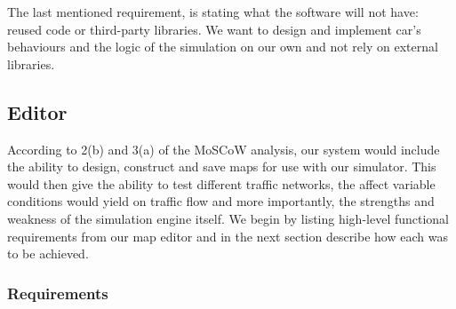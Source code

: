 The last mentioned requirement, is stating what the software will not have: reused code or third-party libraries. We want to design and implement car's behaviours and the logic of the simulation on our own and not rely on external libraries.

\pagebreak

\subsection{Editor}\label{ss:req-editor}
According to 2(b) and 3(a) of the MoSCoW analysis, our system would include the ability to design, construct and save maps for use with our simulator. This would then give the ability to test different traffic networks, the affect variable conditions would yield on traffic flow and more importantly, the strengths and weakness of the simulation engine itself. We begin by listing high-level functional requirements from our map editor and in the next section describe how each was to be achieved.

\subsubsection{Requirements}\label{ss:req-editor-enum}

